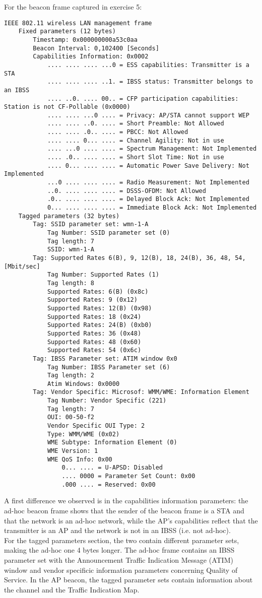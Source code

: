 %
For the beacon frame captured in exercise 5:
\begin{lstlisting}
IEEE 802.11 wireless LAN management frame
    Fixed parameters (12 bytes)
        Timestamp: 0x000000000a53c0aa
        Beacon Interval: 0,102400 [Seconds]
        Capabilities Information: 0x0002
            .... .... .... ...0 = ESS capabilities: Transmitter is a STA
            .... .... .... ..1. = IBSS status: Transmitter belongs to an IBSS
            .... ..0. .... 00.. = CFP participation capabilities: Station is not CF-Pollable (0x0000)
            .... .... ...0 .... = Privacy: AP/STA cannot support WEP
            .... .... ..0. .... = Short Preamble: Not Allowed
            .... .... .0.. .... = PBCC: Not Allowed
            .... .... 0... .... = Channel Agility: Not in use
            .... ...0 .... .... = Spectrum Management: Not Implemented
            .... .0.. .... .... = Short Slot Time: Not in use
            .... 0... .... .... = Automatic Power Save Delivery: Not Implemented
            ...0 .... .... .... = Radio Measurement: Not Implemented
            ..0. .... .... .... = DSSS-OFDM: Not Allowed
            .0.. .... .... .... = Delayed Block Ack: Not Implemented
            0... .... .... .... = Immediate Block Ack: Not Implemented
    Tagged parameters (32 bytes)
        Tag: SSID parameter set: wmn-1-A
            Tag Number: SSID parameter set (0)
            Tag length: 7
            SSID: wmn-1-A
        Tag: Supported Rates 6(B), 9, 12(B), 18, 24(B), 36, 48, 54, [Mbit/sec]
            Tag Number: Supported Rates (1)
            Tag length: 8
            Supported Rates: 6(B) (0x8c)
            Supported Rates: 9 (0x12)
            Supported Rates: 12(B) (0x98)
            Supported Rates: 18 (0x24)
            Supported Rates: 24(B) (0xb0)
            Supported Rates: 36 (0x48)
            Supported Rates: 48 (0x60)
            Supported Rates: 54 (0x6c)
        Tag: IBSS Parameter set: ATIM window 0x0
            Tag Number: IBSS Parameter set (6)
            Tag length: 2
            Atim Windows: 0x0000
        Tag: Vendor Specific: Microsof: WMM/WME: Information Element
            Tag Number: Vendor Specific (221)
            Tag length: 7
            OUI: 00-50-f2
            Vendor Specific OUI Type: 2
            Type: WMM/WME (0x02)
            WME Subtype: Information Element (0)
            WME Version: 1
            WME QoS Info: 0x00
                0... .... = U-APSD: Disabled
                .... 0000 = Parameter Set Count: 0x00
                .000 .... = Reserved: 0x00
\end{lstlisting}
%
A first difference we observed is in the capabilities information parameters:
the ad-hoc beacon frame shows that the sender of the beacon frame is a STA and that the network is
an ad-hoc network, while the AP's capabilities reflect that the transmitter is an AP
and the network is not in an IBSS (i.e. not ad-hoc).\\
For the tagged parameters section, the two contain different parameter sets, making the ad-hoc one 4 bytes longer. The ad-hoc frame contains an IBSS parameter set with the Announcement Traffic Indication Message (ATIM) window and vendor specificic information parameters concerning Quality of Service.
 In the AP beacon, the tagged parameter sets contain information about the channel and the Traffic Indication Map.
